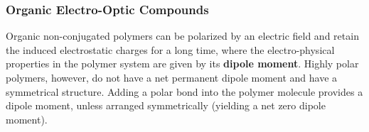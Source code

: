 %  







\subsubsection{Organic Electro-Optic Compounds}
\label{sec:thbkgd:SOHplatform}


Organic non-conjugated polymers can be polarized by an electric field and retain the induced electrostatic charges for a long time, where the electro-physical properties in the polymer system are given by its \textbf{dipole moment}. Highly polar polymers, however, do not have a net permanent dipole moment and have a symmetrical structure. Adding a polar bond into the polymer molecule provides a dipole moment, unless arranged symmetrically (yielding a net zero dipole moment). %

